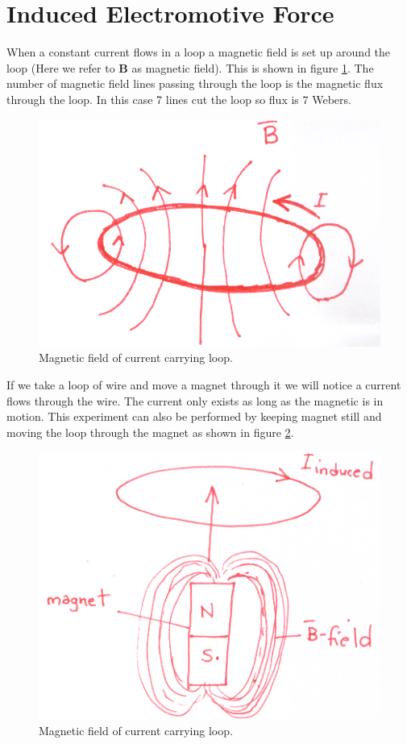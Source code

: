 \documentclass[12pt,a4paper]{article}
\begin{document}
\section{Induced Electromotive Force}
When a constant current flows in a loop a magnetic field is set up around the loop (Here we refer to 
\textbf{B} as magnetic field). This is shown in figure \ref{B-field-loop}. The number of magnetic field lines passing through the loop is the magnetic flux through the loop. In this case 7 lines cut the loop so flux is $7$ Webers.
\begin{figure}[H]
\centering
\includegraphics[scale=0.5]{BFieldLoop.png}
\caption{Magnetic field of current carrying loop.}
\label{B-field-loop}
\end{figure}
If we take a loop of wire and move a magnet through it we will notice a current flows through the wire. The current only exists as long as the magnetic is in motion. This experiment can also be performed by keeping magnet still and moving the loop through the magnet as shown in figure \ref{Magnet-through-loop}. 
\begin{figure}[H]
\centering
\includegraphics[scale=0.5]{InducedCurrentMagnet.png}
\caption{Magnetic field of current carrying loop.}
\label{Magnet-through-loop}
\end{figure}
\end{document}
